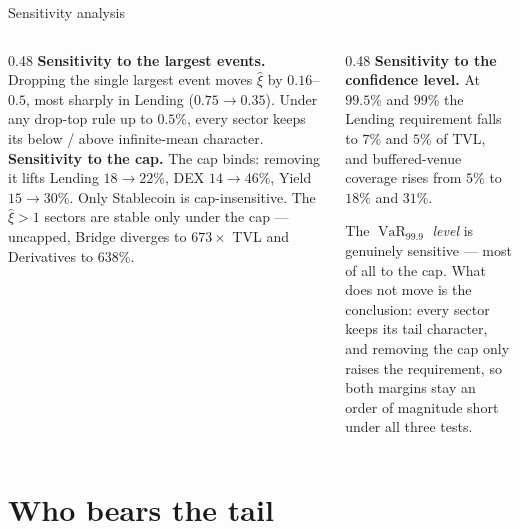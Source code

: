 \documentclass[10pt,xcolor=x11names,aspectratio=169]{beamer}
\newcommand{\VaR}{\operatorname{VaR}}
\begin{document}
\begin{frame}{Sensitivity analysis}
  \begin{columns}[T]
    \begin{column}{0.48\textwidth}
      \textbf{Sensitivity to the largest events.}
      Dropping the single largest event moves $\hat\xi$ by $0.16$--$0.5$,
      most sharply in Lending ($0.75 \to 0.35$). Under any drop-top rule up to
      $0.5\%$, every sector keeps its below / above infinite-mean
      character.
      \vskip 3mm
      \textbf{Sensitivity to the cap.}
      The cap binds: removing it lifts Lending $18 \to 22\%$, DEX
      $14 \to 46\%$, Yield $15 \to 30\%$. Only Stablecoin is
      cap-insensitive. The $\hat\xi>1$ sectors are stable only under the cap
      --- uncapped, Bridge diverges to $673\times$ TVL and Derivatives to
      $638\%$.
    \end{column}
    \begin{column}{0.48\textwidth}
      \textbf{Sensitivity to the confidence level.}
      At $99.5\%$ and $99\%$ the Lending requirement falls to $7\%$ and $5\%$
      of TVL, and buffered-venue coverage rises from $5\%$ to $18\%$ and
      $31\%$.
      \vskip 3mm
      \begin{takeaway}
        The $\VaR_{99.9}$ \emph{level} is genuinely sensitive --- most of all
        to the cap. What does not move is the conclusion: every sector keeps
        its tail character, and removing the cap only raises the requirement,
        so both margins stay an order of magnitude short under all three
        tests.
      \end{takeaway}
    \end{column}
  \end{columns}
\end{frame}

\section{Who bears the tail}
\end{document}
